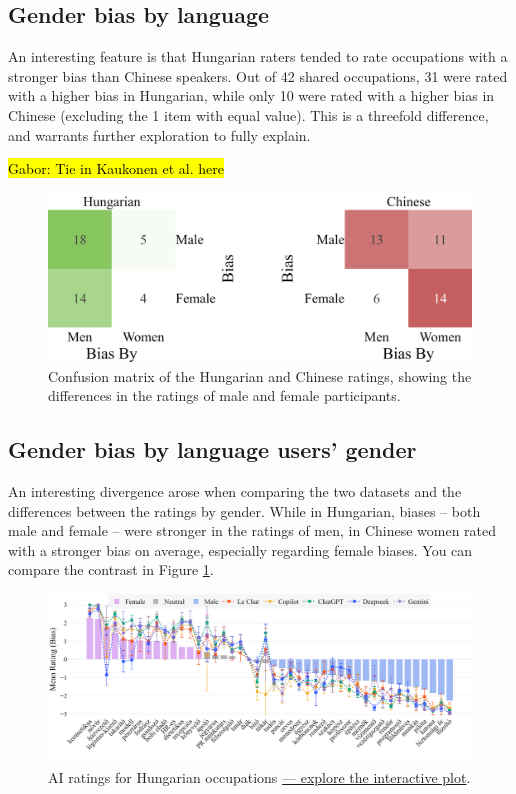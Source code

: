 \documentclass[11pt]{article}
\begin{document}
\subsection{Gender bias by language}

An interesting feature is that Hungarian raters tended to rate occupations with a stronger bias than Chinese speakers. Out of 42 shared occupations, 31 were rated with a higher bias in Hungarian, while only 10 were rated with a higher bias in Chinese (excluding the 1 item with equal value). This is a threefold difference, and warrants further exploration to fully explain.

\hl{Gabor: Tie in Kaukonen et al. here}

\begin{figure}[ht]
  \centering
  \includegraphics[width=\linewidth]{../confusion_matrices}
  \caption{Confusion matrix of the Hungarian and Chinese ratings, showing the differences in the ratings of male and female participants.}  
  \label{fig:confusion_matrices}
\end{figure}

\subsection{Gender bias by language users' gender}

An interesting divergence arose when comparing the two datasets and the differences between the ratings by gender. While in Hungarian, biases -- both male and female -- were stronger in the ratings of men, in Chinese women rated with a stronger bias on average, especially regarding female biases. You can compare the contrast in Figure \ref{fig:confusion_matrices}.


\begin{figure}[!ht]
  \centering
  \includegraphics[width=\linewidth]{../occupations_hu_with_ai}
  \caption{AI ratings for Hungarian occupations \href{https://htmlpreview.github.io/?https://github.com/partigabor/occupational-bias/blob/main/occupations_hu_with_ai.html}{--- explore the interactive plot}.}
  \label{fig:occupations_hu_with_ai}
\end{figure}
\end{document}
